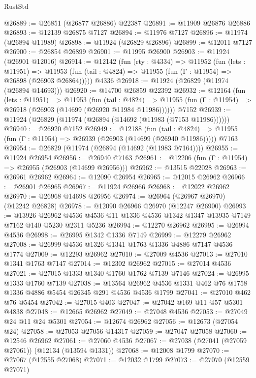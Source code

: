 \begin{lexlean}{RustStd}
\begin{coremodule}
{\begin{coremodule}
{{{{{{{{{{{{{{{{{{{{{{{{{{{{{{{{{{{{{{{{{{{{{{{{{{{{{{{{{{{{{{{{{{{{{{{{{{{{{{{{@26889 := @26851 (@26877 @26886) @22387
@26891 := @11909 @26876 @26886
@26893 := @12139 @26875 @7127
@26894 := @11976 @7127
@26896 := @11974 (@26894 @11989)
@26898 := @11924 (@26829 @26896)
@26899 := @12011 @7127
@26900 := @26854 @26899
@26901 := @11995 @26900
@26903 := @11924 (@26901 @12016)
@26914 := @12142
    (fun (rty : @4334) =>
    @11952
      (fun (lets : @11951) =>
      @11953 (fun (tail : @4824) => @11955 (fun (Γ : @11954) => @26898 (@26903 @26864)))))
    @4336
@26918 := @11924 (@26829 (@11974 (@26894 @14693)))
@26920 := @14700 @26859 @22392
@26932 := @12164
    (fun (lets : @11951) =>
    @11953
      (fun (tail : @4824) =>
      @11955 (fun (Γ : @11954) => @26918 (@26903 (@14699 (@26920 @11984 @11986))))))
    @7152
@26939 := @11924 (@26829 (@11974 (@26894 (@14692 (@11983 (@7153 @11986))))))
@26940 := @26920 @7152
@26949 := @12188
    (fun (tail : @4824) => @11955 (fun (Γ : @11954) => @26939 (@26903 (@14699 (@26940 @11986)))))
    @7163
@26954 := @26829 (@11974 (@26894 (@14692 (@11983 @7164))))
@26955 := @11924 @26954
@26956 := @26940 @7163
@26961 := @12206 (fun (Γ : @11954) => @26955 (@26903 (@14699 @26956)))
@26962 := @13515 @22028
@26963 := @26961 @26962
@26964 := @12090 @26954
@26965 := @12015 @26962
@26966 := @26901 @26965
@26967 := @11924 @26966
@26968 := @12022 @26962
@26970 := @26968 @14698 @26956
@26974 := @26964 (@26967 @26970) (@12242 @26828)
@26978 := @12090 @26966 @26970 (@12247 @26900)
@26993 := @13926
    @26962
    @4536
    @4536
    @11
    @1336
    @4536
    @1342
    @1347
    @13935
    @7149
    @7162
    @140
    @5230
    @2311
    @5236
@26994 := @12270 @26962
@26995 := @26994 @4536
@26998 := @26995 @1342 @1336 @7149
@26999 := @12279 @26962
@27008 := @26999 @4536 @1326 @1341 @1763 @1336 @4886 @7147 @4536 @1774
@27009 := @12293 @26962
@27010 := @27009 @4536
@27013 := @27010 @1341 @1763 @7147
@27014 := @12302 @26962
@27015 := @27014 @4536
@27021 := @27015 @1333 @1340 @1760 @1762 @7139 @7146
@27024 := @26995 @1333 @1760 @7139
@27038 := @13564 @26962 @4536 @1331 @462 @76 @1758 @1336 @4886 @5454 @26345 @291 @4536 @4536 @1799
@27041 := @27010 @462 @76 @5454
@27042 := @27015 @403
@27047 := @27042 @169 @11 @57 @5301 @4838
@27048 := @12665 @26962
@27049 := @27048 @4536
@27053 := @27049 @24 @11 @24 @5301
@27054 := @12674 @26962
@27056 := @12673 (@27054 @24)
@27058 := @27053 @27056 @14317
@27059 := @27047 @27058
@27060 := @12546 @26962
@27061 := @27060 @4536
@27067 := @27038 (@27041 (@27059 @27061)) (@12134 (@13594 @1331))
@27068 := @12008 @1799
@27070 := @27067 (@12555 @27068)
@27071 := @12032 @1799
@27073 := @27070 (@12559 @27071)
}}}}}}}}}}}}}}}}}}}}}}}}}}}}}}}}}}}}}}}}}}}}}}}}}}}}}}}}}}}}}}}}}}}}}}}}}}}}}}}}
\end{coremodule}}
\end{coremodule}
\end{lexlean}
